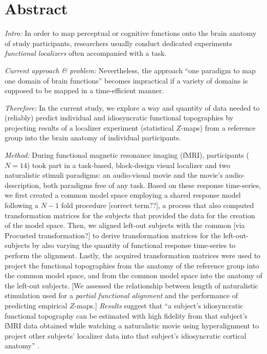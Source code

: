 \section{Abstract}
\textit{Intro:} In order to map perceptual or cognitive functions onto the brain
anatomy of study participants, researchers usually conduct dedicated experiments
\textit{functional localizers} often accompanied with a task.

\textit{Current approach \& problem:} Nevertheless, the approach ``one paradigm
to map one domain of brain functions'' becomes impractical if a variety of
domains is supposed to be mapped in a time-efficient manner.

\textit{Therefore:} In the current study, we explore a way and quantity of data
needed to (reliably) predict individual and idiosyncratic functional
topographies by projecting results of a localizer experiment (statistical
$Z$-maps) from a reference group into the brain anatomy of individual
participants.

\textit{Method:}
During functional magnetic resonance imaging (fMRI), participants ($N=14$) took
part in a task-based, block-design visual localizer and two naturalistic stimuli
paradigms: an audio-visual movie and the movie's audio-description, both
paradigms free of any task.
Based on these response time-series, we first created a common model space
employing a shared response model \citep{chen2015reduced} following a $N-1$ fold
procedure [correct term??], a process that also computed transformation matrices
for the subjects that provided the data for the creation of the model space.
Then, we aligned left-out subjects with the common [via Procusted
transformation?] to derive transformation matrices for the left-out-subjects by
also varying the quantity of functional response time-series to perform the
alignment.
Lastly, the acquired transformation matrices were used to project the functional
topographies from the anatomy of the reference group into the common model
space, and from the common model space into the anatomy of the left-out
subjects.
[We assessed the relationship between length of naturalistic stimulation used
for a \textit{partial functional alignment} and the performance of predicting
empirical $Z$-maps.]
%
\textit{Results} suggest that ``a subject's idiosyncratic functional topography
can be estimated with high fidelity from that subject's fMRI data obtained while
watching a naturalistic movie using hyperalignment to project other subjects’
localizer data into that subject's idiosyncratic cortical anatomy''
\citep{jiahui2020predicting}.

